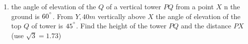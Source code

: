 \documentclass{article}
\begin{document}
\begin{enumerate}
\item the angle of elevation of the $Q$ of a vertical tower $PQ$ from a point $X$ n the ground is $60^{\degree}$. From $Y,40 m$ vertically above $X$ the angle of elevation of the top $Q$ of tower is $45^{\degree}$. Find the height of the tower $PQ$ and the distance $PX$ (use $\sqrt{3}=1.73$)
\end{enumerate}
\end{document}
